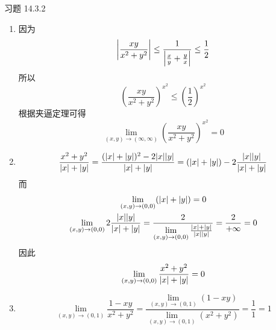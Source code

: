 \begin{problem}
    习题 14.3.2
    \begin{solution}
        \begin{enumerate}
            \item[\textbf{2)}] 因为
            $$
            \abs{\frac{xy}{x^2 + y^2}} \le \frac{1}{\abs{\frac{x}{y} + \frac{y}{x}}} \le \frac{1}{2}
            $$
            所以
            $$
            (\frac{xy}{x^2 + y^2})^{x^2} \le (\frac{1}{2})^{x^2}
            $$
            根据夹逼定理可得
            $$
            \lim_{(x, y) \to (\infty, \infty)} (\frac{xy}{x^2 + y^2})^{x^2} = 0
            $$

            \item[\textbf{4)}]
            $$
            \frac{x^2 + y^2}{\abs{x} + \abs{y}} = \frac{(\abs{x} + \abs{y})^2 - 2 \abs{x} \abs{y}}{\abs{x} + \abs{y}} = (\abs{x} + \abs{y}) - 2 \frac{\abs{x} \abs{y}}{\abs{x} + \abs{y}}
            $$
            而
            $$
            \begin{gathered}
                \lim_{(x, y) \to (0, 0)} (\abs{x} + \abs{y}) = 0 \\
                \lim_{(x, y) \to (0, 0)} 2 \frac{\abs{x} \abs{y}}{\abs{x} + \abs{y}} = \frac{2}{\lim\limits_{(x, y) \to (0, 0)} \frac{\abs{x} + \abs{y}}{\abs{x} \abs{y}}} = \frac{2}{+\infty} = 0
            \end{gathered}
            $$
            因此
            $$
            \lim_{(x, y) \to (0, 0)} \frac{x^2 + y^2}{\abs{x} + \abs{y}} = 0
            $$

            \item[\textbf{6)}]
            $$
            \lim_{(x, y) \to (0, 1)} \frac{1 - xy}{x^2 + y^2} = \frac{\lim\limits_{(x, y) \to (0, 1)} (1 - xy)}{\lim\limits_{(x, y) \to (0, 1)} (x^2 + y^2)} = \frac{1}{1} = 1
            $$
        \end{enumerate}
    \end{solution}
\end{problem}

